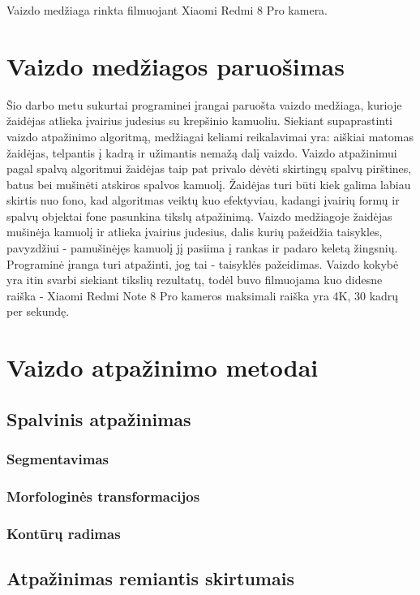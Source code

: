 \documentclass{VUMIFPSbakalaurinis}
\begin{document}
Vaizdo medžiaga rinkta filmuojant Xiaomi Redmi 8 Pro kamera.  

\section{Vaizdo medžiagos paruošimas}

Šio darbo metu sukurtai programinei įrangai paruošta vaizdo medžiaga, kurioje žaidėjas atlieka įvairius judesius su krepšinio kamuoliu. Siekiant supaprastinti vaizdo atpažinimo algoritmą, medžiagai keliami reikalavimai yra: aiškiai matomas žaidėjas, telpantis į kadrą ir užimantis nemažą dalį vaizdo. Vaizdo atpažinimui pagal spalvą algoritmui žaidėjas taip pat privalo dėvėti skirtingų spalvų pirštines, batus bei mušinėti atskiros spalvos kamuolį. Žaidėjas turi būti kiek galima labiau skirtis nuo fono, kad algoritmas veiktų kuo efektyviau, kadangi įvairių formų ir spalvų objektai fone pasunkina tikslų atpažinimą. Vaizdo medžiagoje žaidėjas mušinėja kamuolį ir atlieka įvairius judesius, dalis kurių pažeidžia taisykles, pavyzdžiui - pamušinėjęs kamuolį jį pasiima į rankas ir padaro keletą žingsnių. Programinė įranga turi atpažinti, jog tai - taisyklės pažeidimas. Vaizdo kokybė yra itin svarbi siekiant tikslių rezultatų, todėl buvo filmuojama kuo didesne raiška - Xiaomi Redmi Note 8 Pro kameros maksimali raiška yra 4K, 30 kadrų per sekundę. 

\section{Vaizdo atpažinimo metodai}
\subsection{Spalvinis atpažinimas}
\subsubsection{Segmentavimas}
\subsubsection{Morfologinės transformacijos}
\subsubsection{Kontūrų radimas}
\subsection{Atpažinimas remiantis skirtumais}
\end{document}

